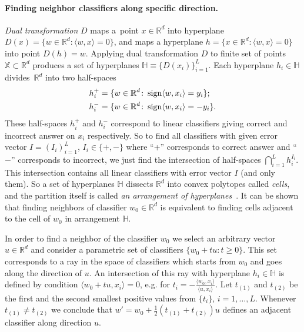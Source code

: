 \documentclass{article} %
\def\XX{\mathbb{X}}
\def\RR{\mathbb{R}}
\def\HH{\mathbb{H}}
\newcommand{\sign}{\mathop{\rm sign}\limits}
\begin{document}
\paragraph{Finding neighbor classifiers along specific direction.}
\emph{Dual transformation} $D$ maps a~point ${x \in \RR^d}$ into hyperplane
${D(x) = \{w \in \RR^d \colon \langle w, x \rangle = 0\}}$,
and maps a hyperplane
${h = \{x \in \RR^d \colon \langle w, x \rangle = 0\}}$
into point $D(h) = w$.
Applying dual transformation $D$ to finite set of points ${\XX \subset \RR^d}$
produces a set of hyperplanes ${\HH \equiv \{D(x_i)\}_{i=1}^{L}}$.
Each hyperplane ${h_i \in \HH}$ divides~$\RR^d$ into two half-spaces
\begin{align*}
    h_i^+ &= \{w \in \RR^d \colon \sign \langle w, x_i \rangle = y_i\};
    \\
    h_i^- &= \{w \in \RR^d \colon \sign \langle w, x_i \rangle = -y_i\}.
\end{align*}
These half-spaces $h_i^+$ and $h_i^-$
correspond to linear classifiers giving correct and incorrect answer
on $x_i$ respectively.
So to find all classifiers with given error vector $I = (I_i)_{i = 1}^{L}$,
$I_i \in \{+, -\}$ where ``+'' corresponds to correct answer and ``$-$'' corresponds
to incorrect,
we just find the intersection of half-spaces $\bigcap_{i = 1}^{L} h_i^{I_i}$.
This intersection contains all linear classifiers with error vector $I$ (and only them).
So a set of hyperplanes $\HH$ dissects $\RR^d$ into convex polytopes called \emph{cells},
and the partition itself is called \emph{an arrangement of hyperplanes}~\cite{agarwal98arrangements}.
It can be shown that finding neighbors of classifier $w_0 \in \RR^d$ is equivalent to finding cells
adjacent to the cell of $w_0$ in arrangement $\HH$.

In order to find a neighbor of the classifier $w_0$ we select an arbitrary vector $u \in \RR^d$
and consider a parametric set of classifiers $\{w_0 + t u \colon t \geq 0\}$.
This set corresponds to a ray in the space of classifiers which starts from $w_0$ and goes along the direction of $u$.
An intersection of this ray with hyperplane $h_i \in \HH$ is defined by condition $\langle w_0 + t u, x_i\rangle = 0$,
e.g. for $t_i = - \frac{\langle w_0, x_i\rangle}{\langle u, x_i\rangle}$.
Let $t_{(1)}$ and $t_{(2)}$ be the first and the second smallest positive values from $\{t_i\}$, $i = 1, \dots, L$.
Whenever $t_{(1)} \neq t_{(2)}$ we conclude that $w' = w_0 + \frac{1}{2}(t_{(1)} + t_{(2)}) u$ defines
an adjacent classifier along direction $u$.
\end{document}
